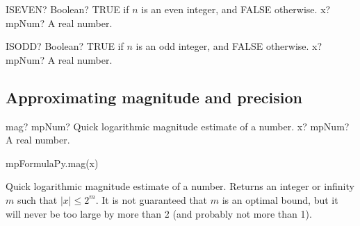 
\begin{mpFunctionsExtract}
	\mpWorksheetFunctionOneNotImplemented
	{ISEVEN? Boolean? TRUE if $n$ is an even integer, and FALSE otherwise.}
	{x? mpNum? A real number.}
\end{mpFunctionsExtract}





\begin{mpFunctionsExtract}
	\mpWorksheetFunctionOneNotImplemented
	{ISODD? Boolean? TRUE if $n$ is an odd integer, and FALSE otherwise.}
	{x? mpNum? A real number.}
\end{mpFunctionsExtract}










\subsection{Approximating magnitude and precision}



\begin{mpFunctionsExtract}
	\mpFunctionOne
	{mag? mpNum? Quick logarithmic magnitude estimate of a number.}
	{x? mpNum? A real number.}
\end{mpFunctionsExtract}


mpFormulaPy.mag(x)

\vpara
Quick logarithmic magnitude estimate of a number. Returns an integer or infinity $m$ such that $|x|\leq 2^m$. It is not guaranteed that $m$ is an optimal bound, but it will never be too large by more than 2 (and probably not more than 1).

